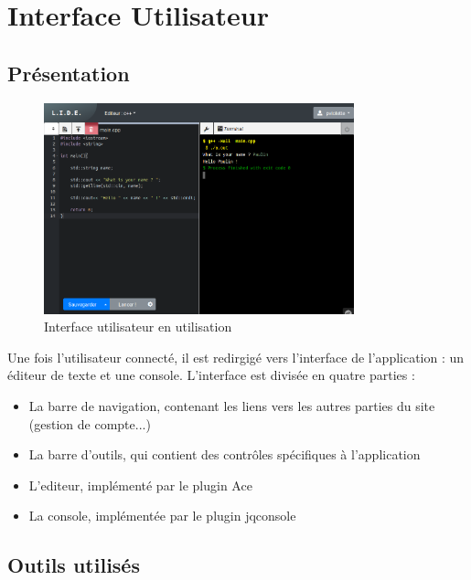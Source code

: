 \chapter{Interface Utilisateur}

\section{Présentation}

\begin{figure}[h]
  \centering
  \includegraphics[width=0.8\textwidth]{./frontend/example1.png}
  \caption{Interface utilisateur en utilisation}
  \label{}
\end{figure}

Une fois l'utilisateur connecté, il est redirgigé vers l'interface de l'application : un éditeur de texte et une console.
L'interface est divisée en quatre parties :
\begin{itemize}
  \item La barre de navigation, contenant les liens vers les autres parties du site (gestion de compte...)
  \item La barre d'outils, qui contient des contrôles spécifiques à l'application
  \item L'editeur, implémenté par le plugin Ace
  \item La console, implémentée par le plugin jqconsole
\end{itemize}

\section{Outils utilisés}

